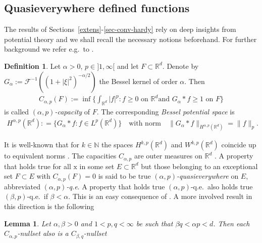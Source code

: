 \documentclass[10pt,leqno]{amsart}
\newtheorem{lemma}[theorem]{Lemma}
\theoremstyle{definition}
\newtheorem{definition}[theorem]{Definition}
\numberwithin{equation}{section}
\begin{document}
\subsection{Quasieverywhere defined functions}

The results of Sections~\ref{extens}-\ref{sec-conv-hardy} rely on deep
insights from potential theory and we shall recall the necessary notions
beforehand. For further background we refer e.g.\ to \cite{ad/he}.

\begin{definition}
\label{d-Besselcapacity}
Let $\alpha >0$, $p \in {]1, \infty [}$ and let $F \subset {{\mathbb R}}^d$. Denote by
$G_\alpha:=\mathcal{F}^{-1}((1+|\xi|^2)^{-\alpha/2})$ the Bessel kernel of order
$\alpha$. Then
\begin{align*}
 C_{\alpha,p}(F):= \inf \Big\{ \int_{{{\mathbb R}}^d} |f|^p : \text{$f \geq 0$ on ${{\mathbb R}}^d$
and $G_\alpha \ast f \geq 1$ on $F$} \Big\}
\end{align*}
is called \emph{$(\alpha,p)$-capacity} of $F$. The corresponding \emph{Bessel
potential space} is
\begin{align*}
 H^{\alpha,p}({{\mathbb R}}^d): = \{G_\alpha \ast f : f \in L^p({{\mathbb R}}^d)\} \quad \text{with
norm} \quad \|G_\alpha \ast f\|_{H^{\alpha,p}({{\mathbb R}}^d)} = \|f\|_p.
\end{align*}
\end{definition}

It is well-known that for $k \in {{\mathbb N}}$ the spaces $H^{k,p}({{\mathbb R}}^d)$ and
$W^{k,p}({{\mathbb R}}^d)$ coincide up to equivalent norms \cite[Sec.~2.3.3]{triebel}. The
capacities $C_{\alpha,p}$ are outer measures on ${{\mathbb R}}^d$
\cite[Sec.~2.3]{ad/he}. A property that holds true for all ${{\mathrm x}}$ in some set $E
\subset {{\mathbb R}}^d$ but those belonging to an exceptional set $F \subset E$ with
$C_{\alpha,p}(F) = 0$ is said to be true \emph{$(\alpha,p)$-quasieverywhere} on
$E$, abbreviated \emph{$(\alpha,p)$-q.e}. A property that holds true
$(\alpha,p)$-q.e.\ also holds true $(\beta,p)$-q.e.\ if $\beta<\alpha$. This is
an easy consequence of \cite[Prop.~2.3.13]{ad/he}. A more involved result in
this direction is the following \cite[Thm.~5.5.1]{ad/he}

\begin{lemma}\label{l-transformation of capacities}
Let $\alpha, \beta > 0$ and $1 < p,q < \infty$ be such that $\beta q <
\alpha p < d$. Then each $C_{\alpha,p}$-nullset also is a $C_{\beta,q}$-nullset 
\end{lemma}
\end{document}
